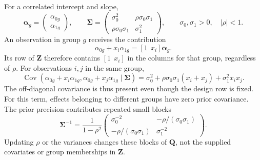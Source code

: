 \documentclass[11pt]{article}
\newcommand{\balpha}{\bm{\alpha}}
\newcommand{\bQ}{\bm{Q}}
\newcommand{\bZ}{\bm{Z}}
\newcommand{\bSigma}{\bm{\Sigma}}
\DeclareMathOperator{\Cov}{Cov}
\begin{document}
For a correlated intercept and slope,
\begin{equation}\label{eq:two-coefficients}
 \balpha_g=\begin{pmatrix}\alpha_{0g}\\\alpha_{1g}\end{pmatrix},\qquad
 \bSigma=\begin{pmatrix}
 \sigma_0^2 & \rho\sigma_0\sigma_1\\
 \rho\sigma_0\sigma_1 & \sigma_1^2
 \end{pmatrix},
 \qquad \sigma_0,\sigma_1>0,\quad |\rho|<1.
\end{equation}
An observation in group $g$ receives the contribution
\begin{equation}
 \alpha_{0g}+x_i\alpha_{1g}=[1\ \ x_i]\balpha_g.
\end{equation}
Its row of $\bZ$ therefore contains $[1\ \ x_i]$ in the columns for that group,
regardless of $\rho$. For observations $i,j$ in the same group,
\begin{equation}\label{eq:iid-crosscov}
 \Cov(\alpha_{0g}+x_i\alpha_{1g},\alpha_{0g}+x_j\alpha_{1g}\mid\bSigma)
 =\sigma_0^2+\rho\sigma_0\sigma_1(x_i+x_j)+\sigma_1^2x_ix_j.
\end{equation}
The off-diagonal covariance is thus present even though the design row is fixed.
For this term, effects belonging to different groups have zero prior covariance.
The prior precision contributes repeated small blocks
\begin{equation}\label{eq:two-precision}
 \bSigma^{-1}=\frac{1}{1-\rho^2}
 \begin{pmatrix}
 \sigma_0^{-2} & -\rho/(\sigma_0\sigma_1)\\
 -\rho/(\sigma_0\sigma_1) & \sigma_1^{-2}
 \end{pmatrix}.
\end{equation}
Updating $\rho$ or the variances changes these blocks of $\bQ$, not the supplied
covariates or group memberships in $\bZ$.
\end{document}
